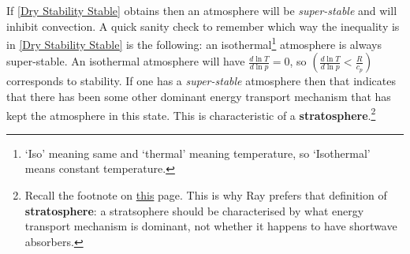 If \ref{Dry Stability Stable} obtains then an atmosphere will be \textit{super-stable} and will inhibit convection. A quick sanity check to remember which way the inequality is in \ref{Dry Stability Stable} is the following: an isothermal\footnote{
    `Iso' meaning same and `thermal' meaning temperature, so `Isothermal' means constant temperature.
} atmosphere is always super-stable. An isothermal atmosphere will have $\frac{d \ln T}{d \ln p} = 0$, so $\left( \frac{d \ln T}{d \ln p} < \frac{R}{c_p} \right)$ corresponds to stability. If one has a \textit{super-stable} atmosphere then that indicates that there has been some other dominant energy transport mechanism that has kept the atmosphere in this state. This is characteristic of a \textbf{stratosphere}.\footnote{
    Recall the footnote on \hyperref[Vertical Structure]{this} page. This is why Ray prefers that definition of \textbf{stratosphere}: a stratsophere should be characterised by what energy transport mechanism is dominant, not whether it happens to have shortwave absorbers.
} 

